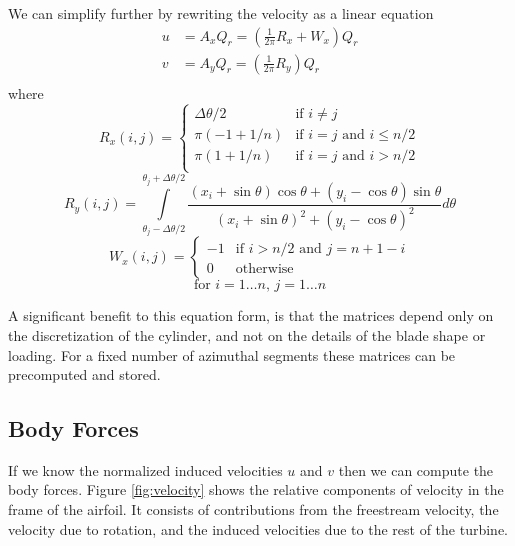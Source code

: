\documentclass{article}
\begin{document}
We can simplify further by rewriting the velocity as a linear equation
\begin{equation}
\begin{aligned}
u &= A_x Q_r = \left(\frac{1}{2\pi}R_x + W_x\right) Q_r \\
v &= A_y Q_r = \left(\frac{1}{2\pi}R_y\right) Q_r \\
\end{aligned}
\end{equation}
where
\begin{equation}
R_x(i, j) =
\begin{cases}
\Delta\theta/2 & \textrm{if } i \neq j \\
\pi(-1 + 1/n) & \textrm{if } i = j \textrm{ and } i \leq n/2 \\
\pi(1  + 1/n) & \textrm{if } i = j \textrm{ and } i > n/2 \\
\end{cases}
\end{equation}
\begin{equation}
R_y(i, j) = \int\limits_{\theta_j - \Delta\theta/2}^{\theta_j + \Delta\theta/2} \frac{(x_i+\sin\theta)\cos\theta + (y_i-\cos\theta)\sin\theta}{(x_i+\sin\theta)^2 + (y_i-\cos\theta)^2} d\theta
\end{equation}
\begin{equation}
W_x(i, j) =
\begin{cases}
-1  & \textrm{if } i > n/2 \textrm{ and } j = n + 1 - i \\
0 & \textrm{otherwise}
\end{cases}
\end{equation}
\begin{equation}
  \textrm{for } i = 1 \ldots n, \, j = 1 \ldots n
\end{equation}

A significant benefit to this equation form, is that the matrices depend only on the discretization of the cylinder, and not on the details of the blade shape or loading.  For a fixed number of azimuthal segments  these matrices can be precomputed and stored.

\subsection{Body Forces}

If we know the normalized induced velocities $u$ and $v$ then we can compute the body forces.  Figure \ref{fig:velocity} shows the relative components of velocity in the frame of the airfoil.  It consists of contributions from the freestream velocity, the velocity due to rotation, and the induced velocities due to the rest of the turbine.
\end{document}
